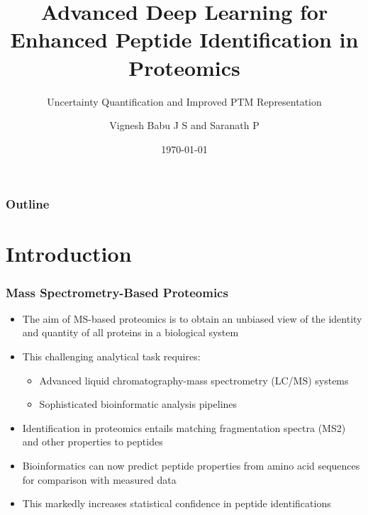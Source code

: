 \documentclass{beamer}
\title{Advanced Deep Learning for Enhanced Peptide Identification in Proteomics}
\subtitle{Uncertainty Quantification and Improved PTM Representation}
\author{Vignesh Babu J S and Saranath P}
\date{\today}
\begin{document}
\begin{frame}
  \titlepage
\end{frame}

\begin{frame}
  \frametitle{Outline}
  \tableofcontents
\end{frame}

\section{Introduction}
\begin{frame}
  \frametitle{Mass Spectrometry-Based Proteomics}
  \begin{itemize}
    \item The aim of MS-based proteomics is to obtain an unbiased view of the identity and quantity of all proteins in a biological system
    \item This challenging analytical task requires:
    \begin{itemize}
      \item Advanced liquid chromatography-mass spectrometry (LC/MS) systems
      \item Sophisticated bioinformatic analysis pipelines
    \end{itemize}
    \item Identification in proteomics entails matching fragmentation spectra (MS2) and other properties to peptides
    \item Bioinformatics can now predict peptide properties from amino acid sequences for comparison with measured data
    \item This markedly increases statistical confidence in peptide identifications
  \end{itemize}
\end{frame}
\end{document}

